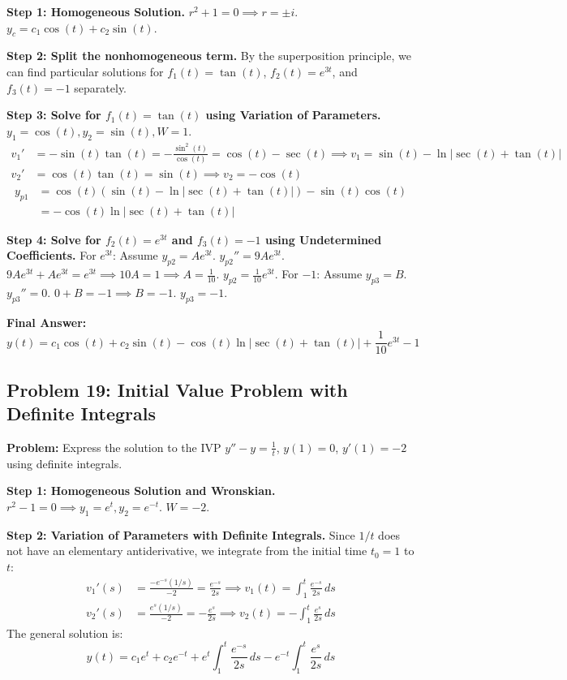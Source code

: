 \documentclass{article}
\begin{document}
\textbf{Step 1: Homogeneous Solution.}
$r^2 + 1 = 0 \implies r = \pm i$. $y_c = c_1 \cos(t) + c_2 \sin(t)$.

\textbf{Step 2: Split the nonhomogeneous term.}
By the superposition principle, we can find particular solutions for $f_1(t) = \tan(t)$, $f_2(t) = e^{3t}$, and $f_3(t) = -1$ separately.

\textbf{Step 3: Solve for $f_1(t) = \tan(t)$ using Variation of Parameters.}
$y_1 = \cos(t), y_2 = \sin(t), W = 1$.
\begin{align*}
v_1' &= -\sin(t)\tan(t) = -\frac{\sin^2(t)}{\cos(t)} = \cos(t) - \sec(t) \implies v_1 = \sin(t) - \ln\left|\sec(t) + \tan(t)\right| \\
v_2' &= \cos(t)\tan(t) = \sin(t) \implies v_2 = -\cos(t)
\end{align*}
\begin{align*}
y_{p1} &= \cos(t)(\sin(t) - \ln\left|\sec(t) + \tan(t)\right|) - \sin(t)\cos(t) \\
&= -\cos(t)\ln\left|\sec(t) + \tan(t)\right|
\end{align*}

\textbf{Step 4: Solve for $f_2(t) = e^{3t}$ and $f_3(t) = -1$ using Undetermined Coefficients.}
For $e^{3t}$: Assume $y_{p2} = A e^{3t}$. $y_{p2}'' = 9A e^{3t}$.
$9A e^{3t} + A e^{3t} = e^{3t} \implies 10A = 1 \implies A = \frac{1}{10}$. $y_{p2} = \frac{1}{10}e^{3t}$.
For $-1$: Assume $y_{p3} = B$. $y_{p3}'' = 0$.
$0 + B = -1 \implies B = -1$. $y_{p3} = -1$.

\textbf{Final Answer:}
\[ y(t) = c_1 \cos(t) + c_2 \sin(t) - \cos(t)\ln\left|\sec(t) + \tan(t)\right| + \frac{1}{10}e^{3t} - 1 \]

\subsection{Problem 19: Initial Value Problem with Definite Integrals}
\textbf{Problem:} Express the solution to the IVP $y'' - y = \frac{1}{t}$, $y(1) = 0$, $y'(1) = -2$ using definite integrals.

\textbf{Step 1: Homogeneous Solution and Wronskian.}
$r^2 - 1 = 0 \implies y_1 = e^t, y_2 = e^{-t}$. $W = -2$.

\textbf{Step 2: Variation of Parameters with Definite Integrals.}
Since $1/t$ does not have an elementary antiderivative, we integrate from the initial time $t_0 = 1$ to $t$:
\begin{align*}
v_1'(s) &= \frac{-e^{-s}(1/s)}{-2} = \frac{e^{-s}}{2s} \implies v_1(t) = \int_1^t \frac{e^{-s}}{2s} \, ds \\
v_2'(s) &= \frac{e^s(1/s)}{-2} = -\frac{e^s}{2s} \implies v_2(t) = -\int_1^t \frac{e^s}{2s} \, ds
\end{align*}
The general solution is:
\[ y(t) = c_1 e^t + c_2 e^{-t} + e^t \int_1^t \frac{e^{-s}}{2s} \, ds - e^{-t} \int_1^t \frac{e^s}{2s} \, ds \]
\end{document}
